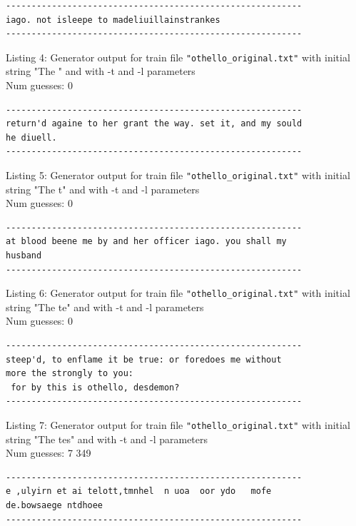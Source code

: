 \documentclass{article}
\begin{document}
\begin{lstlisting}
----------------------------------------------------------
iago. not isleepe to madeliuillainstrankes
----------------------------------------------------------
\end{lstlisting}

Listing 4: Generator output for train file \verb|"othello_original.txt"| with initial string "The " and with -t and -l parameters
\\Num guesses: 0

\begin{lstlisting}
----------------------------------------------------------
return'd againe to her grant the way. set it, and my sould 
he diuell.
----------------------------------------------------------
\end{lstlisting}

Listing 5: Generator output for train file \verb|"othello_original.txt"| with initial string "The t" and with -t and -l parameters
\\Num guesses: 0

\begin{lstlisting}
----------------------------------------------------------
at blood beene me by and her officer iago. you shall my 
husband
----------------------------------------------------------
\end{lstlisting}

Listing 6: Generator output for train file \verb|"othello_original.txt"| with initial string "The te" and with -t and -l parameters
\\Num guesses: 0

\begin{lstlisting}
----------------------------------------------------------
steep'd, to enflame it be true: or foredoes me without 
more the strongly to you:
 for by this is othello, desdemon?
----------------------------------------------------------
\end{lstlisting}

Listing 7: Generator output for train file \verb|"othello_original.txt"| with initial string "The tes" and with -t and -l parameters
\\Num guesses: 7 349

\begin{lstlisting}
----------------------------------------------------------
e ,ulyirn et ai telott,tmnhel  n uoa  oor ydo   mofe   
de.bowsaege ntdhoee 
----------------------------------------------------------
\end{lstlisting}
\end{document}
